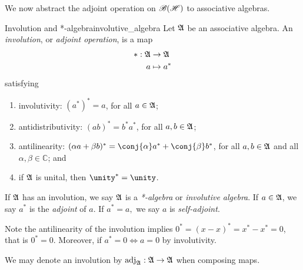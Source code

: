 We now abstract the adjoint operation on \(\mathscr{B}(\mathscr{H})\) to associative algebras.
\begin{definition}{Involution and *-algebra}{involutive_algebra}
    Let \(\mathfrak{A}\) be an associative algebra. An \emph{involution}, or \emph{adjoint operation}, is a map
    \begin{align*}
        * : \mathfrak{A} &\to \mathfrak{A}\\
                      a &\mapsto a^*
    \end{align*}
    satisfying
    \begin{enumerate}[label=(\alph*)]
        \item involutivity: \((a^*)^* = a\), for all \(a \in \mathfrak{A}\);
        \item antidistributivity: \((ab)^* = b^* a^*\), for all \(a, b \in \mathfrak{A}\);
        \item antilinearity: \((\alpha a + \beta b)^* = \conj{\alpha}a^* + \conj{\beta}b^*\), for all \(a,b \in \mathfrak{A}\) and all \(\alpha, \beta \in \mathbb{C}\); and
        \item if \(\mathfrak{A}\) is unital, then \(\unity^* = \unity\).
    \end{enumerate}
    If \(\mathfrak{A}\) has an involution, we say \(\mathfrak{A}\) is a \emph{*-algebra} or \emph{involutive algebra}. If \(a \in \mathfrak{A}\), we say \(a^*\) is the \emph{adjoint} of \(a\). If \(a^* = a,\) we say \(a\) is \emph{self-adjoint}.
\end{definition}
\begin{remark}
    Note the antilinearity of the involution implies \(0^* = (x-x)^* = x^* - x^* = 0\), that is \(0^* = 0\). Moreover, if \(a^* = 0 \iff a = 0\) by involutivity.
\end{remark}
\begin{remark}
    We may denote an involution by \(\operatorname{adj}_{\mathfrak{A}} : \mathfrak{A} \to \mathfrak{A}\) when composing maps.
\end{remark}

